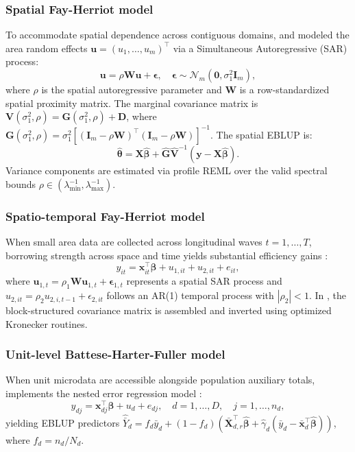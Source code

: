 \documentclass[article]{jss}
\begin{document}
\subsubsection{Spatial Fay-Herriot model}
To accommodate spatial dependence across contiguous domains, \citet{petrucci2006small} and \citet{pratesi2008small} modeled the area random effects $\bm{u} = (u_1, \dots, u_m)^\top$ via a Simultaneous Autoregressive (SAR) process:
%
\begin{equation} \label{eq:sfh_sar}
\bm{u} = \rho \bm{W} \bm{u} + \bm{\epsilon}, \quad \bm{\epsilon} \sim \mathcal{N}_m(\bm{0}, \sigma_1^2 \bm{I}_m),
\end{equation}
%
where $\rho$ is the spatial autoregressive parameter and $\bm{W}$ is a row-standardized spatial proximity matrix. The marginal covariance matrix is $\bm{V}(\sigma_1^2, \rho) = \bm{G}(\sigma_1^2, \rho) + \bm{D}$, where $\bm{G}(\sigma_1^2, \rho) = \sigma_1^2 [(\bm{I}_m - \rho \bm{W})^\top (\bm{I}_m - \rho \bm{W})]^{-1}$. The spatial EBLUP is:
%
\begin{equation} \label{eq:sfh_eblup}
\hat{\bm{\theta}} = \bm{X} \hat{\bm{\beta}} + \hat{\bm{G}} \hat{\bm{V}}^{-1} (\bm{y} - \bm{X} \hat{\bm{\beta}}).
\end{equation}
%
Variance components are estimated via profile REML over the valid spectral bounds $\rho \in (\lambda_{\min}^{-1}, \lambda_{\max}^{-1})$.

\subsubsection{Spatio-temporal Fay-Herriot model}
When small area data are collected across longitudinal waves $t = 1, \dots, T$, borrowing strength across space and time yields substantial efficiency gains \citep{marhuenda2013small}:
%
\begin{equation} \label{eq:stfh_model}
y_{it} = \bm{x}_{it}^\top \bm{\beta} + u_{1,it} + u_{2,it} + e_{it},
\end{equation}
%
where $\bm{u}_{1,t} = \rho_1 \bm{W} \bm{u}_{1,t} + \bm{\epsilon}_{1,t}$ represents a spatial SAR process and $u_{2,it} = \rho_2 u_{2,i,t-1} + \epsilon_{2,it}$ follows an AR(1) temporal process with $|\rho_2| < 1$. In , the block-structured covariance matrix is assembled and inverted using optimized Kronecker routines.

\subsubsection{Unit-level Battese-Harter-Fuller model}
When unit microdata are accessible alongside population auxiliary totals,  implements the nested error regression model \citep{battese1988error}:
%
\begin{equation} \label{eq:bhf_model}
y_{dj} = \bm{x}_{dj}^\top \bm{\beta} + u_d + e_{dj}, \quad d = 1, \dots, D, \quad j = 1, \dots, n_d,
\end{equation}
%
yielding EBLUP predictors $\hat{\bar{Y}}_d = f_d \bar{y}_d + (1 - f_d)(\bar{\bm{X}}_{d, r}^\top \hat{\bm{\beta}} + \hat{\gamma}_d (\bar{y}_d - \bar{\bm{x}}_d^\top \hat{\bm{\beta}}))$, where $f_d = n_d / N_d$.
\end{document}
